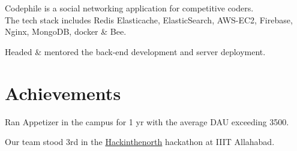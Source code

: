 \documentclass[letterpaper]{deedy-resume} %
\begin{document}
\begin{minipage}[t]{0.66\textwidth}
Codephile is a social networking application for competitive coders.\\
The tech stack includes Redis Elasticache, ElasticSearch, AWS-EC2, Firebase, Nginx, MongoDB, docker \& Bee.
\begin{tightitemize}
\item Headed \& mentored the back-end development and server deployment.
\end{tightitemize}




\section{Achievements} 
\begin{tightitemize}
\sectionspace %
\item Ran Appetizer in the campus for 1 yr with the average DAU exceeding 3500. 
\item Our team stood 3rd in the \href{https://www.hackinthenorth.com/}{Hackinthenorth} hackathon at IIIT Allahabad. 


\end{tightitemize}

\sectionspace %


\end{minipage} %

\end{document}
